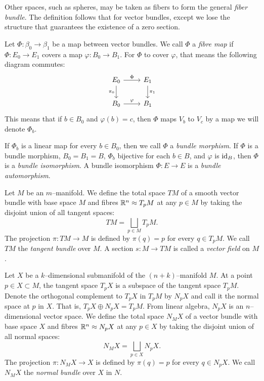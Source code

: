 Other spaces, such as spheres, may be taken as fibers to form the general \emph{fiber bundle}.
The definition follows that for vector bundles, except we lose the structure that guarantees the existence of a zero section.


\begin{defn}
	Let $\Phi:\beta_0\to \beta_1$ be a map between vector bundles.
	We call $\Phi$ a \emph{fibre map} if $\Phi:E_0\to E_1$ covers a map $\varphi:B_0\to B_1$.
	For $\Phi$ to cover $\varphi$, that means the following diagram commutes:
	\[
		\begin{tikzcd}
			E_0 \arrow{r}{\Phi} \arrow[swap]{d}{\pi_0} & E_1 \arrow{d}{\pi_1} \\
			B_0 \arrow{r}{\varphi} & B_1
		\end{tikzcd}
	\]
	This means that if $b\in B_0$ and $\varphi(b)=c$, then $\Phi$ maps $V_b$ to $V_c$ by a map we will denote $\Phi_b$.

	If $\Phi_b$ is a linear map for every $b\in B_0$, then we call $\Phi$ a \emph{bundle morphism}.
	If $\Phi$ is a bundle morphism, $B_0=B_1=B$, $\Phi_b$ bijective for each $b\in B$, and $\varphi$ is $\textrm{id}_{B}$, then $\Phi$ is a \emph{bundle isomorphism}.
	A bundle isomorphism $\Phi:E\to E$ is a \emph{bundle automorphism}.
\end{defn}

\begin{defn}
	Let $M$ be an $m$--manifold.
	We define the total space $TM$ of a smooth vector bundle with base space $M$ and fibres $\mathbb{R}^n\approx T_p M$ at any $p\in M$ by taking the disjoint union of all tangent spaces:
	\[
		TM = \bigsqcup_{p\in M} T_p M.
	\]
	The projection $\pi:TM\to M$ is defined by $\pi(q)=p$ for every $q\in T_p M$.
	We call $TM$ the \emph{tangent bundle} over $M$.
	A section $s:M\to TM$ is called a \emph{vector field} on $M$.
\end{defn}

\begin{defn}
	Let $X$ be a $k$--dimensional submanifold of the $(n+k)$--manifold $M$.
	At a point $p\in X\subset M$, the tangent space $T_p X$ is a subspace of the tangent space $T_p M$.
	Denote the orthogonal complement to $T_p X$ in $T_p M$ by $N_p X$ and call it the normal space at $p$ in $X$.
	That is, $T_p X\oplus N_p X = T_p M$.
	From linear algebra, $N_p X$ is an $n$--dimensional vector space.
	We define the total space $N_M X$ of a vector bundle with base space $X$ and fibres $\mathbb{R}^n\approx N_p X$ at any $p\in X$ by taking the disjoint union of all normal spaces:
	\[
		N_M X = \bigsqcup_{p\in X} N_p X.
	\]
	The projection $\pi:N_M X\to X$ is defined by $\pi(q)=p$ for every $q\in N_p X$.
	We call $N_M X$ the \emph{normal bundle} over $X$ in $N$.	
\end{defn}

